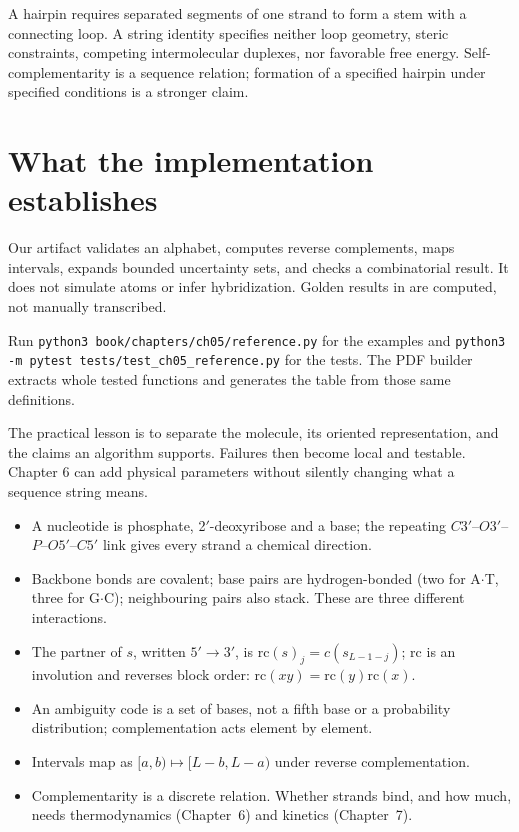 A hairpin requires separated segments of one strand to form a stem with a
connecting loop. A string identity specifies neither loop geometry, steric
constraints, competing intermolecular duplexes, nor favorable free energy.
Self-complementarity is a sequence relation; formation of a specified
hairpin under specified conditions is a stronger claim.

\section{What the implementation establishes}

Our artifact validates an alphabet, computes reverse complements, maps
intervals, expands bounded uncertainty sets, and checks a combinatorial
result. It does not simulate atoms or infer hybridization. Golden results
in  are computed, not manually transcribed.

Run \texttt{python3 book/chapters/ch05/reference.py} for the examples and
\texttt{python3 -m pytest tests/test\_ch05\_reference.py} for the tests.
The PDF builder extracts whole tested functions and generates the table
from those same definitions.

The practical lesson is to separate the molecule, its oriented representation,
and the claims an algorithm supports. Failures then become local and
testable. Chapter 6 can add physical parameters without silently changing
what a sequence string means.

\begin{KeyIdeas}
\begin{itemize}\setlength{\itemsep}{2pt}
\item A nucleotide is phosphate, 2$'$-deoxyribose and a base; the repeating
$C3'$--$O3'$--$P$--$O5'$--$C5'$ link gives every strand a chemical direction.
\item Backbone bonds are covalent; base pairs are hydrogen-bonded (two for A$\cdot$T,
three for G$\cdot$C); neighbouring pairs also stack. These are three different
interactions.
\item The partner of $s$, written $5'\to3'$, is
$\mathrm{rc}(s)_j=c(s_{L-1-j})$; $\mathrm{rc}$ is an involution and reverses block
order: $\mathrm{rc}(xy)=\mathrm{rc}(y)\mathrm{rc}(x)$.
\item An ambiguity code is a set of bases, not a fifth base or a probability
distribution; complementation acts element by element.
\item Intervals map as $[a,b)\mapsto[L-b,L-a)$ under reverse complementation.
\item Complementarity is a discrete relation. Whether strands bind, and how
much, needs thermodynamics (Chapter~6) and kinetics (Chapter~7).
\end{itemize}
\end{KeyIdeas}

